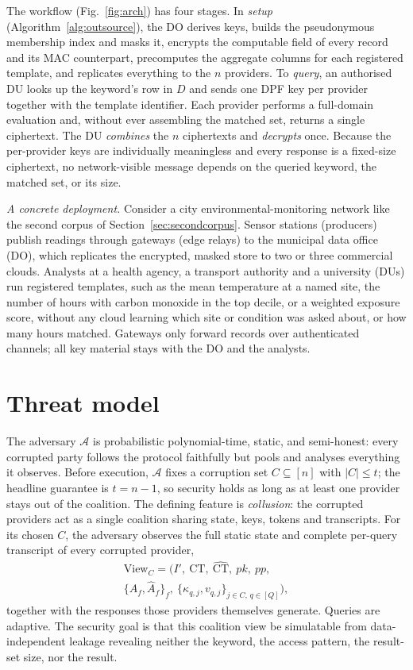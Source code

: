 \documentclass[a4paper,fleqn]{cas-sc}
\newcommand{\Adv}{\mathcal{A}}
\begin{document}
The workflow (Fig.~\ref{fig:arch}) has four stages. In \emph{setup}
(Algorithm~\ref{alg:outsource}), the DO derives keys, builds the pseudonymous
membership index and masks it, encrypts the computable field of every record
and its MAC counterpart, precomputes the aggregate columns for each
registered template, and replicates everything to the $n$ providers. To
\emph{query}, an authorised DU looks up the keyword's row in $D$ and sends one
DPF key per provider together with the template identifier. Each provider
performs a full-domain evaluation and, without ever assembling the matched
set, returns a single ciphertext. The DU \emph{combines} the $n$ ciphertexts
and \emph{decrypts} once. Because the per-provider keys are individually
meaningless and every response is a fixed-size ciphertext, no
network-visible message depends on the queried keyword, the matched set, or
its size.

\emph{A concrete deployment.} Consider a city environmental-monitoring network
like the second corpus of Section~\ref{sec:secondcorpus}. Sensor stations
(producers) publish readings through gateways (edge relays) to the municipal
data office (DO), which replicates the encrypted, masked store to two or three
commercial clouds. Analysts at a health agency, a transport authority and a
university (DUs) run registered templates, such as the mean temperature at a
named site, the number of hours with carbon monoxide in the top decile, or a
weighted exposure score, without any cloud learning which site or condition
was asked about, or how many hours matched. Gateways only forward records over
authenticated channels; all key material stays with the DO and the analysts.

\section{Threat model}
\label{sec:threat}

The adversary $\Adv$ is probabilistic polynomial-time, static, and
semi-honest: every corrupted party follows the protocol faithfully but pools
and analyses everything it observes. Before execution, $\Adv$ fixes a
corruption set $C\subseteq[n]$ with $|C|\le t$; the headline guarantee is
$t=n-1$, so security holds as long as at least one provider stays out of the
coalition. The defining feature is \emph{collusion}: the corrupted providers
act as a single coalition sharing state, keys, tokens and transcripts. For its
chosen $C$, the adversary observes the full static state and complete
per-query transcript of every corrupted provider,
\begin{multline*}
\mathrm{View}_C = \big( I',\ \text{CT},\ \widehat{\text{CT}},\ pk,\ pp,\\
\{A_f,\widehat{A}_f\}_f,\
\{\kappa_{q,j},v_{q,j}\}_{j\in C,\,q\in[Q]} \big),
\end{multline*}
together with the responses those providers themselves generate. Queries are
adaptive. The security goal is that this coalition view be simulatable from
data-independent leakage revealing neither the keyword, the access pattern,
the result-set size, nor the result.
\end{document}
